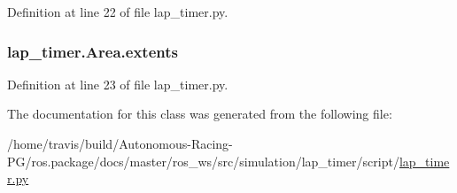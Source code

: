Definition at line 22 of file lap\+\_\+timer.\+py.

\subsubsection[{\texorpdfstring{extents}{extents}}]{\setlength{\rightskip}{0pt plus 5cm}lap\+\_\+timer.\+Area.\+extents}\hypertarget{classlap__timer_1_1_area_a9c808f67a0835a36528d4b7abd4f2950}{}\label{classlap__timer_1_1_area_a9c808f67a0835a36528d4b7abd4f2950}


Definition at line 23 of file lap\+\_\+timer.\+py.



The documentation for this class was generated from the following file\+:\begin{DoxyCompactItemize}
\item 
/home/travis/build/\+Autonomous-\/\+Racing-\/\+P\+G/ros.\+package/docs/master/ros\+\_\+ws/src/simulation/lap\+\_\+timer/script/\hyperlink{lap__timer_8py}{lap\+\_\+timer.\+py}\end{DoxyCompactItemize}
